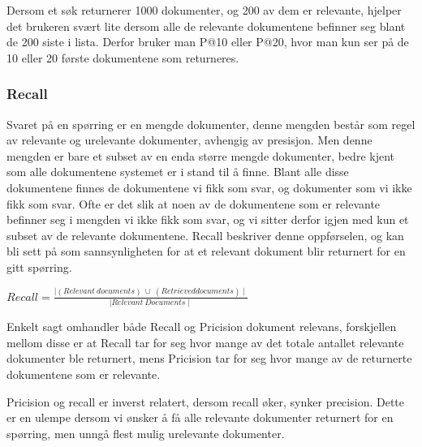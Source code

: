 \vspace{3 mm}

Dersom et søk returnerer 1000 dokumenter, og 200 av dem er relevante, hjelper det brukeren svært lite dersom alle de relevante dokumentene befinner seg blant de 200 siste i lista. Derfor bruker man P@10 eller P@20, hvor man kun ser på de 10 eller 20 første dokumentene som returneres.

\vspace{3 mm}

\subsubsection*{Recall}
Svaret på en spørring er en mengde dokumenter, denne mengden består som regel av relevante og urelevante dokumenter, avhengig av presisjon. Men denne mengden er bare et subset av en enda større mengde dokumenter, bedre kjent som alle dokumentene systemet er i stand til å finne. Blant alle disse dokumentene finnes de dokumentene vi fikk som svar, og dokumenter som vi ikke fikk som svar. Ofte er det slik at noen av de dokumentene som er relevante befinner seg i mengden vi ikke fikk som svar, og vi sitter derfor igjen med kun et subset av de relevante dokumentene. Recall beskriver denne oppførselen, og kan bli sett på som sannsynligheten for at et relevant dokument blir returnert for en gitt spørring.

\vspace{3 mm}

\begin{center}
$Recall = \frac{\mid (Relevant \ documents) \ \cup \ (Retrieved documents) \mid}{\mid Relevant \ Documents \mid}$
\end{center}

\vspace{3 mm}

Enkelt sagt omhandler både Recall og Pricision dokument relevans, forskjellen mellom disse er at Recall tar for seg hvor mange av det totale antallet relevante dokumenter ble returnert, mens Pricision tar for seg hvor mange av de returnerte dokumentene som er relevante.

\vspace{3 mm}

Pricision og recall er inverst relatert, dersom recall øker, synker precision. Dette er en ulempe dersom vi ønsker å få alle relevante dokumenter returnert for en spørring, men unngå flest mulig urelevante dokumenter.

\vspace{6 mm}

